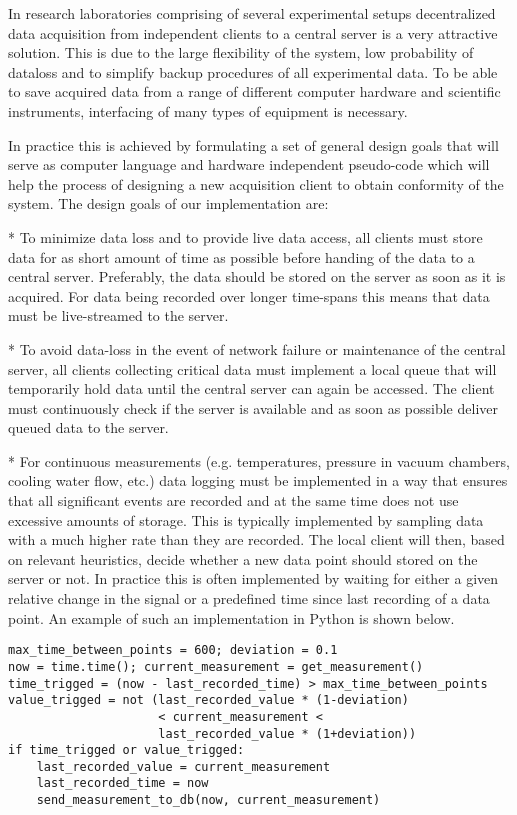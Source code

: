 In research laboratories comprising of several experimental setups decentralized
data acquisition from independent clients to a central server is a very
attractive solution. This is due to the large flexibility of the system, low
probability of dataloss and to simplify backup procedures of all experimental
data. To be able to save acquired data from a range of different computer
hardware and scientific instruments, interfacing of many types of equipment is
necessary.

In practice this is achieved by formulating a set of general design goals that
will serve as computer language and hardware independent pseudo-code which will
help the process of designing a new acquisition client to obtain conformity of
the system. The design goals of our implementation are:

* To minimize data loss and to provide live data access, 
  all clients must store data for as short amount of time as
  possible before handing of the data to a central server. Preferably, the data
  should be stored on the server as soon as it is acquired. For data being
  recorded over longer time-spans this means that data must be live-streamed to
  the server.

* To avoid data-loss in the event of network failure or maintenance
  of the central server, all clients collecting critical data must implement a
  local queue that will temporarily hold data until the central server can
  again be accessed. The client must continuously check if the server is
  available and as soon as possible deliver queued data to the server.

* For continuous measurements (e.g. temperatures, pressure in vacuum chambers,
  cooling water flow, etc.) data logging must be implemented in a way that
  ensures that all significant events are recorded and at the same time does
  not use excessive amounts of storage. This is typically implemented by
  sampling data with a much higher rate than they are recorded. The local
  client will then, based on relevant heuristics, decide whether a new data
  point should stored on the server or not. In practice this is often
  implemented by waiting for either a given relative change in the signal or a
  predefined time since last recording of a data point. An example of such an
  implementation in Python is shown below.

\begin{verbatim}
max_time_between_points = 600; deviation = 0.1
now = time.time(); current_measurement = get_measurement()
time_trigged = (now - last_recorded_time) > max_time_between_points
value_trigged = not (last_recorded_value * (1-deviation)
                     < current_measurement <
                     last_recorded_value * (1+deviation))
if time_trigged or value_trigged:
    last_recorded_value = current_measurement
    last_recorded_time = now
    send_measurement_to_db(now, current_measurement)
\end{verbatim}
  
